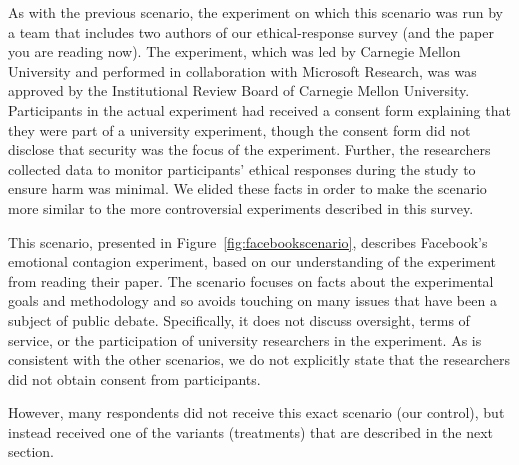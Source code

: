 As with the previous scenario, the experiment on which this scenario was run by a team that includes two authors of our ethical-response survey (and the paper you are reading now).  The experiment, which was led by Carnegie Mellon University and performed in collaboration with Microsoft Research, was was approved by the Institutional Review Board of Carnegie Mellon University.
Participants in the actual experiment had received a consent form explaining that they were part of a university experiment, though the consent form did not disclose that security was the focus of the experiment.  Further, the researchers collected data to monitor participants' ethical responses during the study to ensure harm was minimal.  We elided these facts in order to make the scenario more similar to the more controversial experiments described in this survey.

\label{scenario:Facebook}
This scenario, presented in Figure~\ref{fig:facebookscenario}, describes Facebook's emotional contagion experiment, based on our understanding of the experiment from reading their paper.  The scenario focuses on facts about the experimental goals and methodology and so avoids touching on many issues that have been a subject of public debate.  Specifically, it does not discuss oversight, terms of service, or the participation of university researchers in the experiment.  As is consistent with the other scenarios, we do not explicitly state that the researchers did not obtain consent from participants.

However, many respondents did not receive this exact scenario (our control), but instead received one of the variants (treatments) that are described in the next section.

